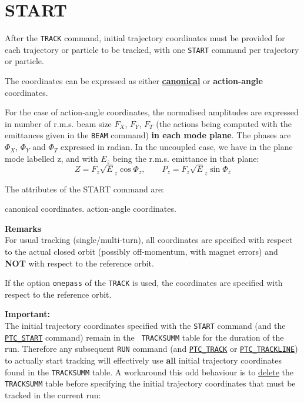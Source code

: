 \section{START}
\label{sec:start}

After the {\tt TRACK} command, initial trajectory coordinates must be
provided for each trajectory or particle to be tracked, with one
{\tt START} command per trajectory or particle.

The coordinates can be expressed as either
\href{../Introduction/tables.html#canon}{{\bf canonical}}
or {\bf action-angle} coordinates.


For the case of action-angle coordinates, the normalised amplitudes are
expressed in number of r.m.s. beam size $F_X$, $F_Y$, $F_T$ (the actions
being computed with the emittances given in the {\tt BEAM} command)
{\bf in each mode plane}. 
The phases are $\Phi_X$, $\Phi_Y$ and $\Phi_T$ expressed in
radian. In the uncoupled case, we have in the plane mode labelled z, and
with $E_z$ being the r.m.s. emittance in that plane:\\
\begin{equation}
Z = F_z \sqrt E_z \cos\Phi_z , \qquad P_z= F_z \sqrt E_z \sin\Phi_z
\end{equation}

The attributes of the START command are:
\begin{madlist}
   canonical coordinates. 
   action-angle coordinates.
\end{madlist}

{\bf Remarks} \\
For usual tracking (single/multi-turn), all coordinates are specified
with respect to the actual closed orbit (possibly off-momentum, with
magnet errors) and {\bf NOT} with respect to the reference orbit.

If the option {\tt onepass} of the {\tt TRACK} is used, the
coordinates are specified with respect to the reference orbit.

{\bf Important:} \\
The initial trajectory coordinates specified with the {\tt START} command (and 
the \hyperref[sec:ptc_start]{\tt PTC\_START} command) remain in the {\tt 
TRACKSUMM} table for the duration of the \madx run. Therefore any subsequent 
{\tt RUN} command (and \hyperref[sec:ptc_trcak]{\tt PTC\_TRACK} or 
\hyperref[sec:ptc_trackline]{\tt PTC\_TRACKLINE}) to actually start tracking 
will effectively use {\bf all} 
initial trajectory coordinates found in the {\tt TRACKSUMM} table.
A workaround this odd behaviour is to \hyperref[sec:delete]{delete} the {\tt 
TRACKSUMM} table before 
specifying the initial trajectory coordinates that must be tracked in the 
current run:



